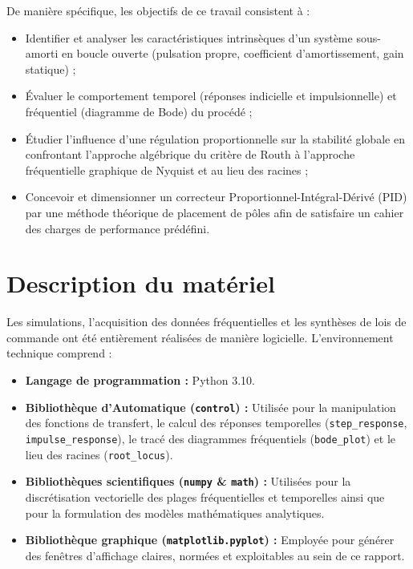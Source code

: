 \documentclass[11pt,a4paper]{article}
\begin{document}
De manière spécifique, les objectifs de ce travail consistent à :
\begin{itemize}
    \item Identifier et analyser les caractéristiques intrinsèques d'un système sous-amorti en boucle ouverte (pulsation propre, coefficient d'amortissement, gain statique) ;
    \item Évaluer le comportement temporel (réponses indicielle et impulsionnelle) et fréquentiel (diagramme de Bode) du procédé ;
    \item Étudier l'influence d'une régulation proportionnelle sur la stabilité globale en confrontant l'approche algébrique du critère de Routh à l'approche fréquentielle graphique de Nyquist et au lieu des racines ;
    \item Concevoir et dimensionner un correcteur Proportionnel-Intégral-Dérivé (PID) par une méthode théorique de placement de pôles afin de satisfaire un cahier des charges de performance prédéfini.
\end{itemize}

\section{Description du matériel}

Les simulations, l'acquisition des données fréquentielles et les synthèses de lois de commande ont été entièrement réalisées de manière logicielle. L'environnement technique comprend :
\begin{itemize}
    \item \textbf{Langage de programmation :} Python 3.10.
    \item \textbf{Bibliothèque d'Automatique (\texttt{control}) :} Utilisée pour la manipulation des fonctions de transfert, le calcul des réponses temporelles (\texttt{step\_response}, \texttt{impulse\_response}), le tracé des diagrammes fréquentiels (\texttt{bode\_plot}) et le lieu des racines (\texttt{root\_locus}).
    \item \textbf{Bibliothèques scientifiques (\texttt{numpy} \& \texttt{math}) :} Utilisées pour la discrétisation vectorielle des plages fréquentielles et temporelles ainsi que pour la formulation des modèles mathématiques analytiques.
    \item \textbf{Bibliothèque graphique (\texttt{matplotlib.pyplot}) :} Employée pour générer des fenêtres d'affichage claires, normées et exploitables au sein de ce rapport.
\end{itemize}
\end{document}
